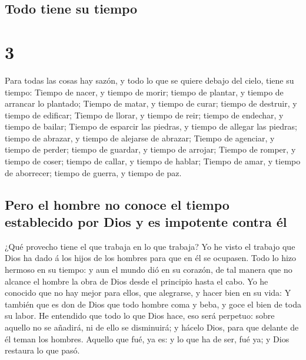 \hypertarget{todo-tiene-su-tiempo}{%
\subsection{Todo tiene su tiempo}\label{todo-tiene-su-tiempo}}

\hypertarget{section-21-3}{%
\section{3}\label{section-21-3}}

 Para todas las cosas hay sazón, y todo lo que se quiere
debajo del cielo, tiene su tiempo:  Tiempo de nacer, y
tiempo de morir; tiempo de plantar, y tiempo de arrancar lo plantado;
 Tiempo de matar, y tiempo de curar; tiempo de destruir, y
tiempo de edificar;  Tiempo de llorar, y tiempo de reir;
tiempo de endechar, y tiempo de bailar;  Tiempo de
esparcir las piedras, y tiempo de allegar las piedras; tiempo de
abrazar, y tiempo de alejarse de abrazar;  Tiempo de
agenciar, y tiempo de perder; tiempo de guardar, y tiempo de arrojar;
 Tiempo de romper, y tiempo de coser; tiempo de callar, y
tiempo de hablar;  Tiempo de amar, y tiempo de aborrecer;
tiempo de guerra, y tiempo de paz.

\hypertarget{pero-el-hombre-no-conoce-el-tiempo-establecido-por-dios-y-es-impotente-contra-uxe9l}{%
\subsection{Pero el hombre no conoce el tiempo establecido por Dios y es
impotente contra
él}\label{pero-el-hombre-no-conoce-el-tiempo-establecido-por-dios-y-es-impotente-contra-uxe9l}}

 ¿Qué provecho tiene el que trabaja en lo que trabaja?
 Yo he visto el trabajo que Dios ha dado á los hijos de
los hombres para que en él se ocupasen.  Todo lo hizo
hermoso en su tiempo: y aun el mundo dió en su corazón, de tal manera
que no alcance el hombre la obra de Dios desde el principio hasta el
cabo.  Yo he conocido que no hay mejor para ellos, que
alegrarse, y hacer bien en su vida:  Y también que es don
de Dios que todo hombre coma y beba, y goce el bien de toda su labor.
 He entendido que todo lo que Dios hace, eso será
perpetuo: sobre aquello no se añadirá, ni de ello se disminuirá; y
hácelo Dios, para que delante de él teman los hombres. 
Aquello que fué, ya es: y lo que ha de ser, fué ya; y Dios restaura lo
que pasó.

